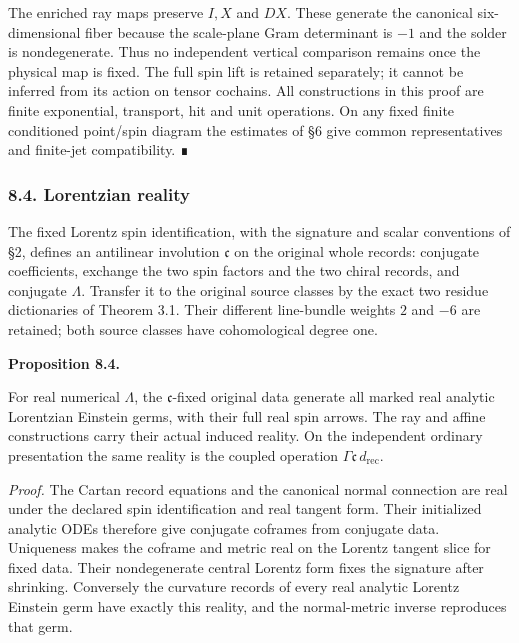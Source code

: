 \documentclass[
  english,
  11pt,
  reqno]{amsart}
\makeatletter
\newcommand{\pandocstatementheading}[1]{%
  \par\addpenalty{\@beginparpenalty}%
  \addvspace{.5\baselineskip plus .2\baselineskip minus .2\baselineskip}%
  {\normalfont\bfseries #1\par}%
  \nobreak\@afterindenttrue\@afterheading
}
\makeatother
\begin{document}
The enriched ray maps preserve \(I,X\) and \(DX\). These generate the
canonical six-dimensional fiber because the scale-plane Gram determinant
is \(-1\) and the solder is nondegenerate. Thus no independent vertical
comparison remains once the physical map is fixed. The full spin lift is
retained separately; it cannot be inferred from its action on tensor
cochains. All constructions in this proof are finite exponential,
transport, hit and unit operations. On any fixed finite conditioned
point/spin diagram the estimates of §6 give common representatives and
finite-jet compatibility. ∎

\protect{}\label{sec:gg-lorentz-reality}

\subsubsection{8.4. Lorentzian reality}\label{lorentzian-reality}

The fixed Lorentz spin identification, with the signature and scalar
conventions of §2, defines an antilinear involution \(\mathfrak c\) on
the original whole records: conjugate coefficients, exchange the two
spin factors and the two chiral records, and conjugate \(\Lambda\).
Transfer it to the original source classes by the exact two residue
dictionaries of Theorem 3.1. Their different line-bundle weights \(2\)
and \(-6\) are retained; both source classes have cohomological degree
one.

\pandocstatementheading{\protect{}\label{prop:gg-coupled-lorentz-reality}Proposition 8.4.}

For real numerical \(\Lambda\), the \(\mathfrak c\)-fixed original data
generate all marked real analytic Lorentzian Einstein germs, with their
full real spin arrows. The ray and affine constructions carry their
actual induced reality. On the independent ordinary presentation the
same reality is the coupled operation
\(\Gamma\mathfrak c\,d_{\mathrm{rec}}\).

\emph{Proof.} The Cartan record equations and the canonical normal
connection are real under the declared spin identification and real
tangent form. Their initialized analytic ODEs therefore give conjugate
coframes from conjugate data. Uniqueness makes the coframe and metric
real on the Lorentz tangent slice for fixed data. Their nondegenerate
central Lorentz form fixes the signature after shrinking. Conversely the
curvature records of every real analytic Lorentz Einstein germ have
exactly this reality, and the normal-metric inverse reproduces that
germ.
\end{document}
